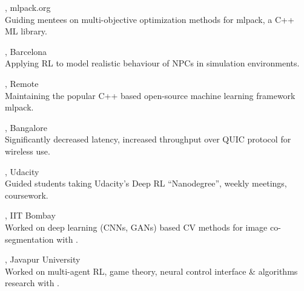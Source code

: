 \documentclass[mm]{simple_style}
\begin{document}
\begin{resume}
, mlpack.org \\
Guiding mentees on multi-objective optimization methods for mlpack, a C++ ML library.\\

\vspace{-4.5ex}

, Barcelona \\
Applying RL to model realistic behaviour of NPCs in simulation environments.\\

\vspace{-4.5ex}

, Remote \\
Maintaining the popular C++ based open-source machine learning framework mlpack.\\

\vspace{-4.5ex}

, Bangalore \\
Significantly decreased latency, increased throughput over QUIC protocol for wireless use.\\

\vspace{-4.5ex}

, Udacity \\
Guided students taking Udacity's Deep RL ``Nanodegree'', weekly meetings, coursework.\\

\vspace{-4.5ex}

, IIT Bombay \\
Worked on deep learning (CNNs, GANs) based CV methods for image co-segmentation with .\\

\vspace{-4.5ex}

, Javapur University \\
Worked on multi-agent RL, game theory, neural control interface \& algorithms research with .\\


\end{resume}
\end{document}
